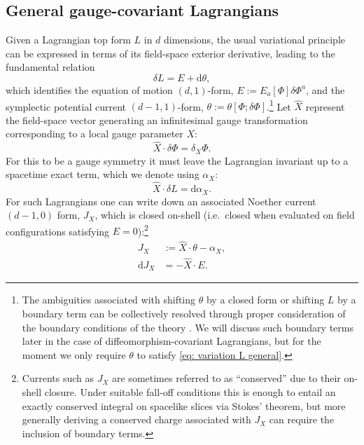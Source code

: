 \documentclass[]{jkpaper}
\theoremstyle{plain}
\theoremstyle{definition}
\newcommand{\fins}{\cdot}
\newcommand{\sd}{\mathrm {d}}
\def\extd{\mathrm {d}}
\newcommand{\fd}{\delta}
\begin{document}
\subsection{General gauge-covariant Lagrangians}
\label{subsec: general gauge constraints}
Given a Lagrangian top form $L$ in $d$ dimensions, the usual variational principle can be expressed in terms of its field-space exterior derivative, leading to the fundamental relation
\begin{equation}\label{eq: variation L general}
    \fd L = E+\sd \theta,
\end{equation}
which identifies the equation of motion $(d,1)$-form, $E:=E_a[\Phi] \delta \Phi^a$, and the symplectic potential current $(d-1,1)$-form, $\theta:=\theta[\Phi;\delta\Phi]$.\footnote{The ambiguities associated with shifting $\theta$ by a closed form or shifting $L$ by a boundary term can be collectively resolved through proper consideration of the boundary conditions of the theory \cite{Harlow:2019yfa}.  We will discuss such boundary terms later in the case of diffeomorphism-covariant Lagrangians, but for the moment we only require $\theta$ to satisfy \eqref{eq: variation L general}.}  
Let $\hat{X}$ represent the field-space vector generating an infinitesimal gauge transformation corresponding to a local gauge parameter $X$:
\begin{equation}\label{eq: gauge action}
\hat{X}\fins\fd\Phi = \delta_X\Phi.
\end{equation}
For this to be a gauge symmetry it must leave the Lagrangian invariant up to a spacetime exact term, which we denote using $\alpha_X$:
\begin{equation}\label{eq: covariant L general}
    \hat{X}\fins\fd L =\sd \alpha_X.
\end{equation}
For such Lagrangians one can write down an associated  Noether current $(d-1,0)$ form, $J_X$, which is closed on-shell (i.e.\ closed when evaluated on field configurations satisfying $E=0$):\footnote{\label{footnote: J conserved}Currents such as $J_X$ are sometimes referred to as ``conserved'' due to their on-shell closure.  Under suitable fall-off conditions this is enough to entail an exactly conserved integral on spacelike slices via Stokes' theorem, but more generally deriving a conserved charge associated with $J_X$ can require the inclusion of boundary terms.}
\begin{align}
    \label{eq: define J general}
    J_X &:=\hat{X}\fins \theta-\alpha_X,\\
    \label{eq: closed J general}
    \extd J_X &= -\hat{X}\cdot E.
\end{align}
\end{document}
